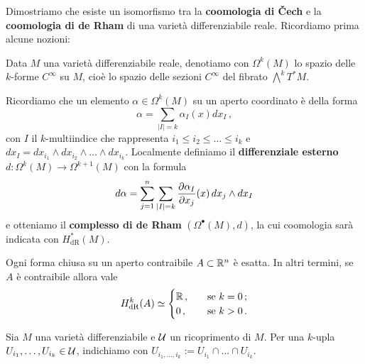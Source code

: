\begin{ex!}
	Dimostriamo che esiste un isomorfismo tra la 
	\textbf{coomologia di \v{C}ech} e la \textbf{coomologia di de Rham}
	di una varietà differenziabile reale. 
	Ricordiamo prima alcune nozioni:
	
	\begin{df}
		Data $M$ una varietà differenziabile reale,
		denotiamo con $\Omega^{k}(M)$ lo spazio delle $k$-forme
		$C^{\infty}$ su $M$, cioè lo spazio delle sezioni $C^{\infty}$
		del fibrato $\bigwedge^{k} T^{*}M$.
	\end{df}
	
	Ricordiamo che un elemento
		$\alpha \in \Omega^{k}(M)$ su un aperto coordinato
		è della forma
		\begin{equation*}
			\alpha = \sum_{|I| = k} \alpha_{I}(x) dx_{I}\,,
		\end{equation*}
		con $I$ il $k$-multiindice che rappresenta $i_{1} \le i_{2} \le \dots \le i_{k}$
		e $dx_{I} = dx_{i_{1}} \wedge dx_{i_{2}} \wedge \dots \wedge dx_{i_{k}}$.
		Localmente definiamo il \textbf{differenziale esterno} 
		$d : \Omega^{k}(M) \to \Omega^{k+1}(M)$ con la formula
		\begin{equation*}
			d\alpha = \sum_{j=1}^{n}\sum_{|I|=k} \frac{\partial \alpha_{I}}{\partial x_{j}}(x) \, 
			dx_{j} \wedge dx_{I}
		\end{equation*}
		e otteniamo il \textbf{complesso di de Rham} $(\Omega^{\bullet}(M),d)$,
		la cui coomologia sarà indicata con $H^{*}_{\mathrm{dR}}(M)$.
	
	\begin{lemma**}[Poincarè]
		Ogni forma chiusa su un aperto contraibile $A \subset {\mathbb R}^{n}$ è esatta.
		In altri termini, se $A$ è contraibile allora vale
		\begin{equation*}
			H^{k}_{\mathrm{dR}}(A) \simeq
			\begin{cases}
				{\mathbb R}\,, \quad &\text{se } k=0\,;\\
				0\,, \quad &\text{se } k>0\,.
			\end{cases}
		\end{equation*}
	\end{lemma**}
		
		Sia $M$ una varietà differenziabile e $\mathcal{U}$ un ricoprimento di $M$.
		Per una $k$-upla $U_{i_{1}}, \dots, U_{i_{k}} \in \mathcal{U}$, 
		indichiamo con $U_{i_{1}, \dots, i_{k}} := U_{i_{1}} \cap \dots \cap U_{i_{k}}$.
		

\end{ex!}
